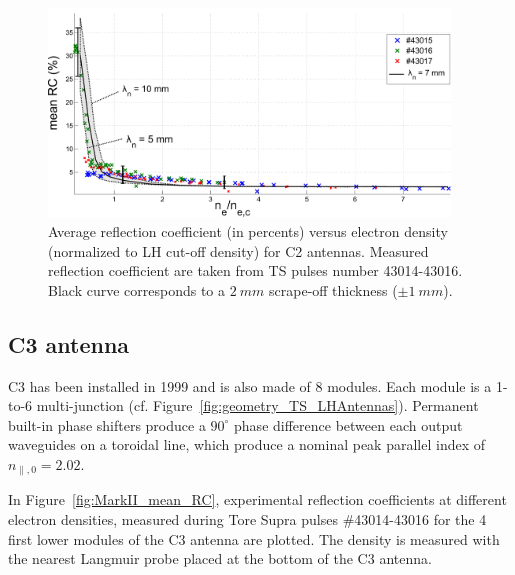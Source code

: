 \begin{figure}[h]
	\centering
	\includegraphics[width=0.95\textwidth]{figures/chap2/Tore_Supra/C2_mean_CR_modBas}
	\caption{Average reflection  coefficient (in percents) versus electron density (normalized to LH cut-off density) for C2 antennas. Measured reflection  coefficient are taken from TS pulses number 43014-43016. Black curve corresponds to a $2~mm$ scrape-off thickness ($\pm 1~mm$).}
	\label{fig:MarkI_mean_RC}
\end{figure}

\subsection{C3 antenna}
C3 has been installed in 1999 and is also made of 8 modules. Each module is a 1-to-6 multi-junction (cf. Figure~\ref{fig:geometry_TS_LHAntennas}). Permanent built-in phase shifters produce a $90^\circ$ phase difference between each output waveguides on a toroidal line, which produce a nominal peak parallel index of $n_{\parallel,0}=2.02$.

In Figure~\ref{fig:MarkII_mean_RC}, experimental reflection coefficients at different electron densities, measured during Tore Supra pulses \#43014-43016 for the 4 first lower modules of the C3 antenna are plotted. The density is measured with the nearest Langmuir probe placed at the bottom of the C3 antenna. 

